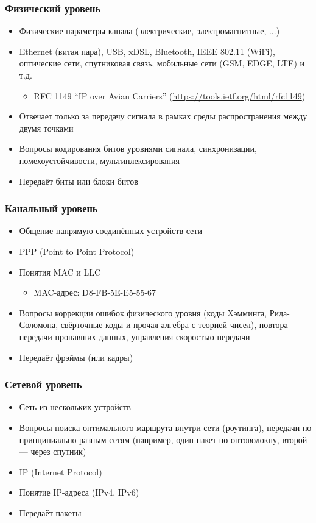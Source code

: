 \documentclass[xetex,mathserif,serif]{beamer}
\begin{document}
	\begin{frame}
		\frametitle{Физический уровень}
		\begin{itemize}
			\item Физические параметры канала (электрические, электромагнитные, ...)
			\item Ethernet (витая пара), USB, xDSL, Bluetooth, IEEE 802.11 (WiFi), оптические сети, спутниковая связь, мобильные сети (GSM, EDGE, LTE) и т.д.
			\begin{itemize}
				\item RFC 1149 ``IP over Avian Carriers'' (\url{https://tools.ietf.org/html/rfc1149})
			\end{itemize}
			\item Отвечает только за передачу сигнала в рамках среды распространения между двумя точками
			\item Вопросы кодирования битов уровнями сигнала, синхронизации, помехоустойчивости, мультиплексирования
			\item Передаёт биты или блоки битов
		\end{itemize}
	\end{frame}

	\begin{frame}
		\frametitle{Канальный уровень}
		\begin{itemize}
			\item Общение напрямую соединённых устройств сети
			\item PPP (Point to Point Protocol)
			\item Понятия MAC и LLC
			\begin{itemize}
				\item MAC-адрес: D8-FB-5E-E5-55-67
			\end{itemize}
			\item Вопросы коррекции ошибок физического уровня (коды Хэмминга, Рида-Соломона, свёрточные коды и прочая алгебра с теорией чисел), повтора передачи пропавших данных, управления скоростью передачи
			\item Передаёт фрэймы (или кадры)
		\end{itemize}
	\end{frame}

	\begin{frame}
		\frametitle{Сетевой уровень}
		\begin{itemize}
			\item Сеть из нескольких устройств
			\item Вопросы поиска оптимального маршрута внутри сети (роутинга), передачи по принципиально разным сетям (например, один пакет по оптоволокну, второй --- через спутник)
			\item IP (Internet Protocol)
			\item Понятие IP-адреса (IPv4, IPv6)
			\item Передаёт пакеты
		\end{itemize}
	\end{frame}
\end{document}
